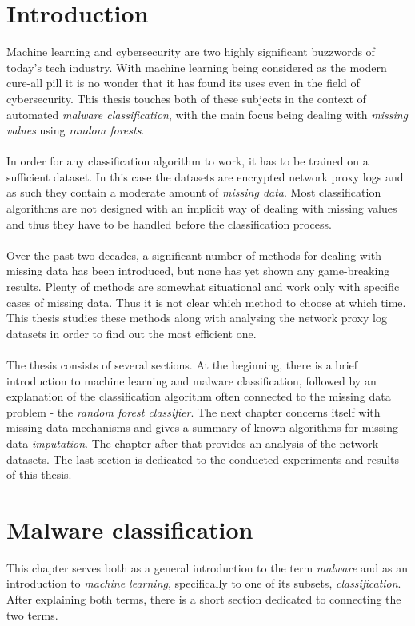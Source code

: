 \documentclass[11pt]{article}
\begin{document}
  \section*{Introduction}
    Machine learning and cybersecurity are two highly significant buzzwords of today's tech industry. With machine learning being considered as the modern cure-all pill it is no wonder that it has found its uses even in the field of cybersecurity. This thesis touches both of these subjects in the context of automated {\it malware classification}, with the main focus being dealing with {\it missing values} using {\it random forests}.
    \\~\\
    In order for any classification algorithm to work, it has to be trained on a sufficient dataset. In this case the datasets are encrypted network proxy logs and as such they contain a moderate amount of {\it missing data}. Most classification algorithms are not designed with an implicit way of dealing with missing values and thus they have to be handled before the classification process.
    \\~\\
    Over the past two decades, a significant number of methods for dealing with missing data has been introduced, but none has yet shown any game-breaking results. Plenty of methods are somewhat situational and work only with specific cases of missing data. Thus it is not clear which method to choose at which time. This thesis studies these methods along with analysing the network proxy log datasets in order to find out the most efficient one.
    \\~\\
    The thesis consists of several sections. At the beginning, there is a brief introduction to machine learning and malware classification, followed by an explanation of the classification algorithm often connected to the missing data problem - the {\it random forest classifier}. The next chapter concerns itself with missing data mechanisms and gives a summary of known algorithms for missing data {\it imputation}. The chapter after that provides an analysis of the network datasets. The last section is dedicated to the conducted experiments and results of this thesis.
  \newpage
  \section{Malware classification}
      This chapter serves both as a general introduction to the term {\it malware} and as an introduction to {\it machine learning}, specifically to one of its subsets, {\it classification}. After explaining both terms, there is a short section dedicated to connecting the two terms.
\end{document}
